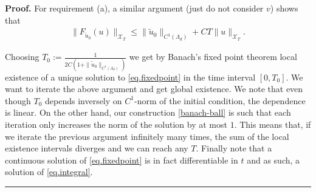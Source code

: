 \documentclass[10pt,a4paper]{amsart}
\newcommand{\cX}{\mathcal{X}}
\newenvironment{proof}[1][Proof]{\noindent\textbf{#1.} }{\ \rule{0.5em}{0.5em}}
\begin{document}
\begin{proof}
For requirement (a), a similar argument (just do not consider $v$) shows that 
\begin{align*}
\|F_{\tilde u_0}(u)\|_{\cX_T}\le \|\tilde u_0\|_{C^1(\Lambda_d)}+CT\|u\|_{\cX_T}.
\end{align*}

Choosing $T_0:=\frac{1}{2C\left(1+\|\tilde u_0\|_{C^1(\Lambda_d)}\right)}$ we get by Banach's fixed point theorem local existence of a unique solution to \eqref{eq.fixedpoint} in the time interval $[0,T_0]$. We want to iterate the above argument and get global existence. We note that even though $T_0$ depends inversely on $C^1$-norm of the initial condition, the dependence is linear. On the other hand, our construction \eqref{banach-ball} is such that each iteration only increases the norm of the solution by at most $1$. This means that, if we iterate the previous argument infinitely many times, the sum of the local existence intervals diverges and we can reach any $T$. Finally note that a continuous solution of \eqref{eq.fixedpoint} is in fact differentiable in $t$ and as such, a solution of \eqref{eq.integral}.
\end{proof}
\end{document}

